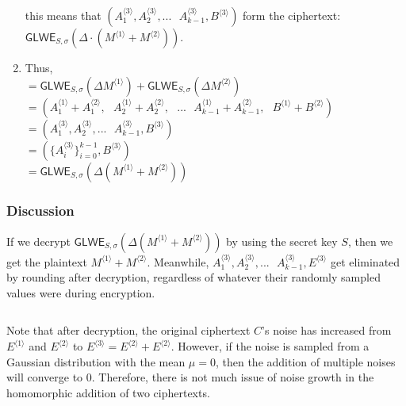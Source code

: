 \begin{enumerate}
this means that $(A_1^{\langle 3 \rangle}, A_2^{\langle 3 \rangle}, ... \text{ } A_{k-1}^{\langle 3 \rangle}, B^{\langle 3 \rangle})$ form the ciphertext: $\textsf{GLWE}_{S, \sigma}(\Delta \cdot (M^{\langle 1 \rangle} + M^{\langle 2 \rangle}))$. \\
\item Thus, \\
$= \textsf{GLWE}_{S, \sigma}(\Delta M^{\langle 1 \rangle}) + \textsf{GLWE}_{S, \sigma}(\Delta M^{\langle 2 \rangle})$ \\
$ = ( A_1^{\langle 1 \rangle} + A_1^{\langle 2 \rangle}, \text{ } A_2^{\langle 1 \rangle} + A_2^{\langle 2 \rangle}, \text{ } ... \text{ } A_{k-1}^{\langle 1 \rangle} + A_{k-1}^{\langle 2 \rangle}, \text{ } B^{\langle 1 \rangle} + B^{\langle 2 \rangle} )$ \\
$ = ( A_1^{\langle 3 \rangle}, A_2^{\langle 3 \rangle}, ... \text{ } A_{k-1}^{\langle 3 \rangle}, B^{\langle 3 \rangle})$ \\
$ = ( \{A_i^{\langle 3 \rangle}\}_{i=0}^{k-1}, B^{\langle 3 \rangle})$ \\
$= \textsf{GLWE}_{S, \sigma}(\Delta (M^{\langle 1 \rangle} + M^{\langle 2 \rangle}))$

\begin{flushright}
\qedsymbol{} 
\end{flushright}

\end{enumerate}

\subsubsection{Discussion}
\label{subsubsec:glwe-add-cipher-discuss} 

 If we decrypt $\textsf{GLWE}_{S, \sigma}(\Delta(M^{\langle 1 \rangle} + M^{\langle 2 \rangle}))$ by using the secret key $S$, then we get the plaintext $M^{\langle 1 \rangle} + M^{\langle 2 \rangle}$. Meanwhile, $A_1^{\langle 3 \rangle}, A_2^{\langle 3 \rangle}, ... \text{ } A_{k-1}^{\langle 3 \rangle}, E^{\langle 3 \rangle}$ get eliminated by rounding after decryption, regardless of whatever their randomly sampled values were during encryption.

$ $

 Note that after decryption, the original ciphertext $C$'s noise has increased from $E^{\langle 1 \rangle}$ and $E^{\langle 2 \rangle}$ to $E^{\langle 3 \rangle} = E^{\langle 2 \rangle} + E^{\langle 2 \rangle}$. However, if the noise is sampled from a Gaussian distribution with the mean $\mu = 0$, then the addition of multiple noises will converge to 0. Therefore, there is not much issue of noise growth in the homomorphic addition of two ciphertexts. 

